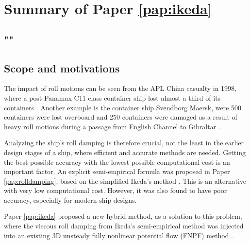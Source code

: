 \section{Summary of Paper \ref{pap:ikeda}}
\subsection*{""}
\subsection*{Scope and motivations}
The impact of roll motions can be seen from the APL China casualty in 1998, where a post-Panamax C11 class container ship lost almost a third of its containers \cite{france_investigation_2001}. Another example is the container ship Svendborg Maersk, were 500 containers were lost overboard and 250 containers were damaged as a result of heavy roll motions during a passage from English Channel to Gibraltar \cite{danish_maritime_accident_investigation_board_marine_2014}.

Analyzing the ship's roll damping is therefore crucial, not the least in the earlier design stages of a ship, where efficient and accurate methods are needed. 
Getting the best possible accuracy with the lowest possible computational cost is an important factor. An explicit semi-empirical formula was proposed in Paper \ref{pap:rolldamping}, based on the simplified Ikeda's method \cite{kawahara_simple_2011}. This is an alternative with very low computational cost. However, it was also found to have poor accuracy, especially for modern ship designs. 

Paper \ref{pap:ikeda} proposed a new hybrid method, as a solution to this problem, where the viscous roll damping from Ikeda’s semi-empirical method was injected into an existing 3D unsteady fully nonlinear potential flow (FNPF) method \cite{kjellberg_fully_2013}.

